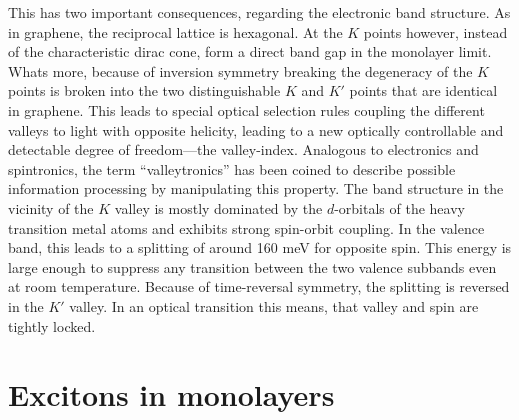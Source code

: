 This has two important consequences, regarding the electronic band structure. As in graphene, the reciprocal lattice is hexagonal. At the $K$ points however, instead of the characteristic dirac cone, \tmds form a direct band gap in the monolayer limit. Whats more, because of inversion symmetry breaking the degeneracy of the $K$ points is broken into the two distinguishable $K$ and $K'$ points that are identical in graphene. This leads to special optical selection rules coupling the different valleys to light with opposite helicity, leading to a new optically controllable and detectable degree of freedom---the valley-index. Analogous to electronics and spintronics, the term ``valleytronics'' has been coined to describe possible information processing by manipulating this property\cite{wang_electronics_2012, xiao_coupled_2012}. The band structure in the vicinity of the $K$ valley is mostly dominated by the $d$-orbitals of the heavy transition metal atoms and exhibits strong spin-orbit coupling. In the valence band, this leads to a splitting of around 160 meV for opposite spin. This energy is large enough to suppress any transition between the two valence subbands even at room temperature. Because of time-reversal symmetry, the splitting is reversed in the $K'$ valley. In an optical transition this means, that valley and spin are tightly locked.

\section{Excitons in \tmdg monolayers}\label{theory_exciton}

